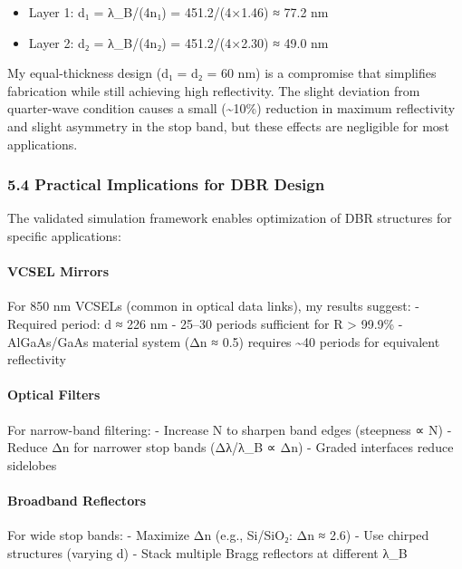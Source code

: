 \documentclass[
]{article}
\providecommand{\tightlist}{%
  \setlength{\itemsep}{0pt}\setlength{\parskip}{0pt}}
\begin{document}
\begin{itemize}
\tightlist
\item
  Layer 1: d₁ = λ\_B/(4n₁) = 451.2/(4×1.46) ≈ 77.2 nm
\item
  Layer 2: d₂ = λ\_B/(4n₂) = 451.2/(4×2.30) ≈ 49.0 nm
\end{itemize}

My equal-thickness design (d₁ = d₂ = 60 nm) is a compromise that
simplifies fabrication while still achieving high reflectivity. The
slight deviation from quarter-wave condition causes a small
(\textasciitilde10\%) reduction in maximum reflectivity and slight
asymmetry in the stop band, but these effects are negligible for most
applications.

\subsubsection{5.4 Practical Implications for DBR
Design}\label{practical-implications-for-dbr-design}

The validated simulation framework enables optimization of DBR
structures for specific applications:

\paragraph{VCSEL Mirrors}\label{vcsel-mirrors}

For 850 nm VCSELs (common in optical data links), my results suggest: -
Required period: d ≈ 226 nm - 25--30 periods sufficient for R
\textgreater{} 99.9\% - AlGaAs/GaAs material system (Δn ≈ 0.5) requires
\textasciitilde40 periods for equivalent reflectivity

\paragraph{Optical Filters}\label{optical-filters}

For narrow-band filtering: - Increase N to sharpen band edges (steepness
∝ N) - Reduce Δn for narrower stop bands (Δλ/λ\_B ∝ Δn) - Graded
interfaces reduce sidelobes

\paragraph{Broadband Reflectors}\label{broadband-reflectors}

For wide stop bands: - Maximize Δn (e.g., Si/SiO₂: Δn ≈ 2.6) - Use
chirped structures (varying d) - Stack multiple Bragg reflectors at
different λ\_B
\end{document}
